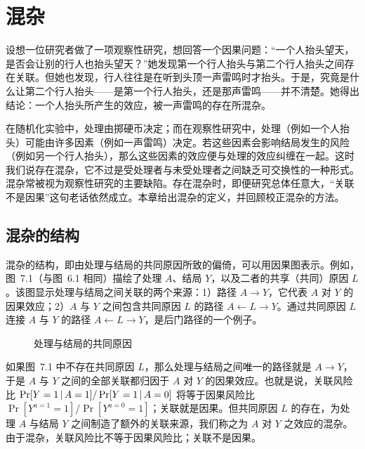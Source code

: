 \chapter{混杂}

设想一位研究者做了一项观察性研究，想回答一个因果问题：“一个人抬头望天，是否会让别的行人也抬头望天？”她发现第一个行人抬头与第二个行人抬头之间存在关联。但她也发现，行人往往是在听到头顶一声雷鸣时才抬头。于是，究竟是什么让第二个行人抬头——是第一个行人抬头，还是那声雷鸣——并不清楚。她得出结论：一个人抬头所产生的效应，被一声雷鸣的存在所混杂。

在随机化实验中，处理由掷硬币决定；而在观察性研究中，处理（例如一个人抬头）可能由许多因素（例如一声雷鸣）决定。若这些因素会影响结局发生的风险（例如另一个行人抬头），那么这些因素的效应便与处理的效应纠缠在一起。这时我们说存在混杂，它不过是受处理者与未受处理者之间缺乏可交换性的一种形式。混杂常被视为观察性研究的主要缺陷。存在混杂时，即便研究总体任意大，“关联不是因果”这句老话依然成立。本章给出混杂的定义，并回顾校正混杂的方法。

\section{混杂的结构}

混杂的结构，即由处理与结局的共同原因所致的偏倚，可以用因果图表示。例如，图~7.1（与图~6.1 相同）描绘了处理 $A$、结局 $Y$，以及二者的共享（共同）原因 $L$。该图显示处理与结局之间关联的两个来源：1）路径 $A\to Y$，它代表 $A$ 对 $Y$ 的因果效应；2）$A$ 与 $Y$ 之间包含共同原因 $L$ 的路径 $A\leftarrow L\to Y$。通过共同原因 $L$ 连接 $A$ 与 $Y$ 的路径 $A\leftarrow L\to Y$，是后门路径的一个例子。

\begin{figure}[htbp]
\centering
{}
\caption{处理与结局的共同原因}
\label{fig:7.1}
\end{figure}

如果图~7.1 中不存在共同原因 $L$，那么处理与结局之间唯一的路径就是 $A\to Y$，于是 $A$ 与 $Y$ 之间的全部关联都归因于 $A$ 对 $Y$ 的因果效应。也就是说，关联风险比 $\Pr[Y=1\,|\, A=1]/\Pr[Y=1\,|\, A=0]$ 将等于因果风险比 $\Pr[Y^{a=1}=1]/\Pr[Y^{a=0}=1]$；关联就是因果。但共同原因 $L$ 的存在，为处理 $A$ 与结局 $Y$ 之间制造了额外的关联来源，我们称之为 $A$ 对 $Y$ 之效应的混杂。由于混杂，关联风险比不等于因果风险比；关联不是因果。

